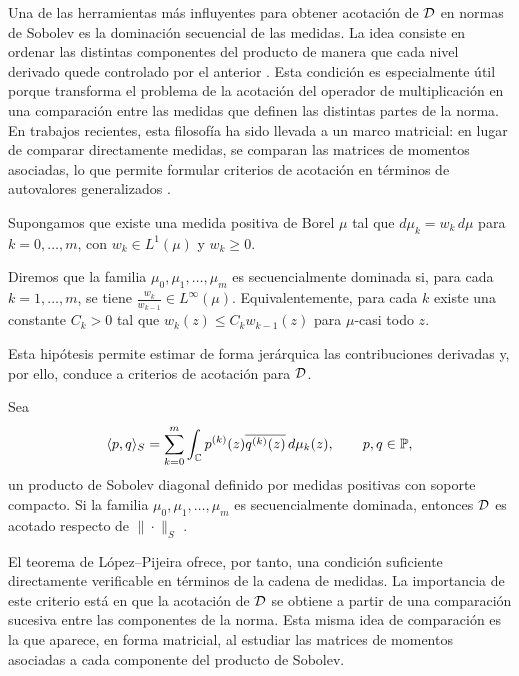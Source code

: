 Una de las herramientas más influyentes para obtener acotación de \(\mathcal{D}\) en normas de Sobolev es la dominación secuencial de las medidas. La idea consiste en ordenar las distintas componentes del producto de manera que cada nivel derivado quede controlado por el anterior \cite{lopez1999zero,lopez2001sobolev,CastroDuran2003}. Esta condición es especialmente útil porque transforma el problema de la acotación del operador de multiplicación en una comparación entre las medidas que definen las distintas partes de la norma. En trabajos recientes, esta filosofía ha sido
llevada a un marco matricial: en lugar de comparar directamente medidas, se
comparan las matrices de momentos asociadas, lo que permite formular criterios de acotación en términos de autovalores generalizados \cite{EG25}.

Supongamos que existe una medida positiva de Borel \(\mu\) tal que
\(d\mu_k = w_k\,d\mu\) para \(k=0,\dots,m\),
con \(w_k\in L^1(\mu)\) y \(w_k\ge 0\).

\begin{defn}
	\label{def:dominacion_secuencial}
	Diremos que la familia \(\mu_0,\mu_1,\dots,\mu_m\) es secuencialmente dominada si,
	para cada \(k=1,\dots,m\), se tiene \(\frac{w_k}{w_{k-1}}\in L^\infty(\mu)\).
	Equivalentemente, para cada \(k\) existe una constante \(C_k>0\) tal que
	\(w_k(z)\le C_k w_{k-1}(z)\) para \(\mu\)-casi todo \(z\).
\end{defn}

Esta hipótesis permite estimar de forma jerárquica las contribuciones derivadas y,
por ello, conduce a criterios de acotación para \(\mathcal{D}\).

\begin{thm}
	\label{thm:lopez_pijeira_dominacion}
	Sea
	\[
		\langle p,q\rangle_S
		=
		\sum_{k=0}^m \int_{\mathbb{C}} p^{(k)}(z)\overline{q^{(k)}(z)}\,d\mu_k(z),
		\qquad p,q\in\mathbb{P},
	\]
	un producto de Sobolev diagonal definido por medidas positivas con soporte
	compacto. Si la familia \(\mu_0,\mu_1,\dots,\mu_m\) es secuencialmente dominada,
	entonces \(\mathcal{D}\) es acotado respecto de \(\|\cdot\|_S\)
	\cite{lopez1999zero,lopez2001sobolev}.
\end{thm}

El teorema de López--Pijeira ofrece, por tanto, una condición suficiente
directamente verificable en términos de la cadena de medidas.
La importancia de este criterio está en que la acotación de \(\mathcal{D}\) se obtiene a
partir de una comparación sucesiva entre las componentes de la norma. Esta misma idea de comparación es la que aparece, en forma matricial, al estudiar las matrices de momentos asociadas a cada componente del producto de Sobolev.

